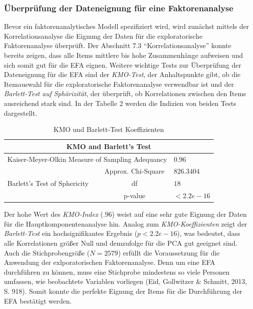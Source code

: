 \documentclass[12pt,a4paper]{article}
\begin{document}
\subsubsection{Überprüfung der Dateneignung für eine Faktorenanalyse} 

Bevor ein faktorenanalytisches Modell spezifiziert wird, wird zunächst mittels der Korrelationsanalyse die Eignung der Daten für die exploratorische Faktorenanalyse überprüft. Der Abschnitt 7.3 "`Korrelationsanalyse"' konnte bereits zeigen, dass alle Items mittlere bis hohe Zusammenhänge aufweisen und sich somit gut für die EFA eignen. Weitere wichtige Tests zur Überprüfung der Dateneignung für die EFA sind der \textit{KMO-Test}, der Anhaltspunkte gibt, ob die Itemauswahl für die exploratorische Faktorenanalyse verwendbar ist und der \textit{Barlett-Test auf Sphärizität}, der überprüft, ob Korrelationen zwischen den Items ausreichend stark sind. In der Tabelle 2 werden die Indizien von beiden Tests dargestellt.


\begin{table}
\centering
\caption{KMO und Barlett-Test Koeffizienten}
\label{tab_KMO}
\begin{tabular}{lcl}
\hline 
\multicolumn{3}{c}{KMO and Barlett's Test} \\ 
\hline 
\multicolumn{2}{l}{Kaiser-Meyer-Olkin Measure of Sampling Adequancy } &   $0.96$ \\ 

&      Approx. Chi-Square                  &  $826.3404$ \\ 

Barlett's Test of Sphericity  &   df  & $18$ \\ 

  &   p-value                         &  $< 2.2e-16 $ \\ 
\hline 
\end{tabular} 

\end{table}

Der hohe Wert des \textit{KMO-Index} ($.96$) weist auf eine sehr gute Eignung der Daten für die Hauptkomponentenanalyse hin. Analog zum \textit{KMO-Koeffizienten} zeigt der \textit{Barlett-Test} ein hochsignifikantes Ergebnis ($p < 2.2e-16$), was bedeutet, dass alle Korrelationen größer Null und demzufolge für die PCA gut geeignet sind. Auch die Stichprobengröße ($N = 2579$) erfüllt die Voraussetzung für die Anwendung der exlporatorischen Faktorenanalyse. Denn um eine EFA durchführen zu können, muss eine Stichprobe mindestens so viele Personen umfassen, wie beobachtete Variablen vorliegen (Eid, Gollwitzer \& Schmitt, 2013, S. 918). Somit konnte die perfekte Eignung der Items für die Durchführung der EFA bestätigt werden.
\end{document}
